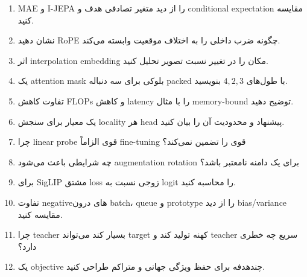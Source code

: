 \documentclass[12pt,openany,oneside]{book}
\begin{document}
\begin{enumerate}[label=\arabic*.]
\item MAE و I-JEPA را از دید متغیر تصادفی هدف و conditional expectation مقایسه کنید.
\item نشان دهید RoPE چگونه ضرب داخلی را به اختلاف موقعیت وابسته می‌کند.
\item اثر interpolation embedding مکان را در تغییر نسبت تصویر تحلیل کنید.
\item یک attention mask بلوکی برای سه دنباله packed با طول‌های $4,2,3$ بنویسید.
\item تفاوت کاهش FLOPs و کاهش latency را با مثال memory-bound توضیح دهید.
\item یک معیار برای سنجش locality هر head پیشنهاد و محدودیت آن را بیان کنید.
\item چرا linear probe قوی الزاماً fine-tuning قوی را تضمین نمی‌کند؟
\item چه شرایطی باعث می‌شود augmentation rotation برای یک دامنه نامعتبر باشد؟
\item برای SigLIP مشتق loss زوجی نسبت به logit را محاسبه کنید.
\item تفاوت negativeهای درون batch، queue و prototype را از دید bias/variance مقایسه کنید.
\item چرا teacher بسیار کند می‌تواند target کهنه تولید کند و teacher سریع چه خطری دارد؟
\item یک objective چندهدفه برای حفظ ویژگی جهانی و متراکم طراحی کنید.
\end{enumerate}
\end{document}
